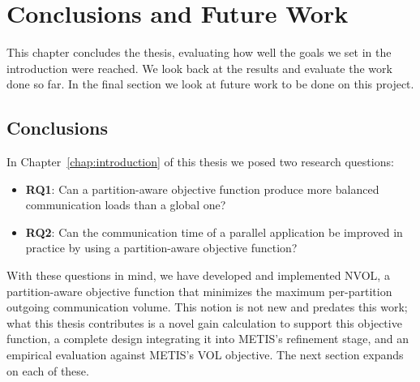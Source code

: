 \chapter{Conclusions and Future Work} 
This chapter concludes the thesis, evaluating how well the goals we set in the introduction were reached. We look back at the results and evaluate the work done so far. In the final section we look at future work to be done on this project. 


\section{Conclusions}
In Chapter~\ref{chap:introduction} of this thesis we posed two research questions: 
\begin{itemize}
	\item \textbf{RQ1}: Can a partition-aware objective function produce more balanced communication loads than a global one?
	\item \textbf{RQ2}: Can the communication time of a parallel application be improved in practice by using a partition-aware objective function?
\end{itemize}
With these questions in mind, we have developed and implemented NVOL, a partition-aware objective function that minimizes the maximum per-partition outgoing communication volume. This notion is not new and predates this work; what this thesis contributes is a novel gain calculation to support this objective function, a complete design integrating it into METIS's refinement stage, and an empirical evaluation against METIS's VOL objective. The next section expands on each of these. 

